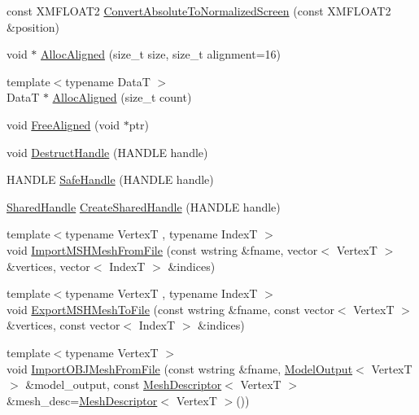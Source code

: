 \begin{DoxyCompactItemize}
\item 
const X\+M\+F\+L\+O\+A\+T2 \hyperlink{namespacemage_a9ef1aad29d7631ee2d88467faca6cc56}{Convert\+Absolute\+To\+Normalized\+Screen} (const X\+M\+F\+L\+O\+A\+T2 \&position)
\item 
void $\ast$ \hyperlink{namespacemage_a5bfc93e9988b3b967b2e0bbf9256eee2}{Alloc\+Aligned} (size\+\_\+t size, size\+\_\+t alignment=16)
\item 
{\footnotesize template$<$typename DataT $>$ }\\DataT $\ast$ \hyperlink{namespacemage_a8facb28d3867eefd618db6c859d349d5}{Alloc\+Aligned} (size\+\_\+t count)
\item 
void \hyperlink{namespacemage_a401c54df21447c491c527735647b5f80}{Free\+Aligned} (void $\ast$ptr)
\item 
void \hyperlink{namespacemage_a7bf12816896ea8d126d397f0c6d571b1}{Destruct\+Handle} (H\+A\+N\+D\+LE handle)
\item 
H\+A\+N\+D\+LE \hyperlink{namespacemage_a80f95ce7eb0d03d5576351663d626b4d}{Safe\+Handle} (H\+A\+N\+D\+LE handle)
\item 
\hyperlink{namespacemage_ab892828913d6129acf71e0cec60467e5}{Shared\+Handle} \hyperlink{namespacemage_a3119898d7caac71d8ee495c3ae3194b1}{Create\+Shared\+Handle} (H\+A\+N\+D\+LE handle)
\item 
{\footnotesize template$<$typename VertexT , typename IndexT $>$ }\\void \hyperlink{namespacemage_ad98d571312abaaa2b0b7dd13958f5100}{Import\+M\+S\+H\+Mesh\+From\+File} (const wstring \&fname, vector$<$ VertexT $>$ \&vertices, vector$<$ IndexT $>$ \&indices)
\item 
{\footnotesize template$<$typename VertexT , typename IndexT $>$ }\\void \hyperlink{namespacemage_a6558ce42c284f76e6bb08bc0f9cabfc3}{Export\+M\+S\+H\+Mesh\+To\+File} (const wstring \&fname, const vector$<$ VertexT $>$ \&vertices, const vector$<$ IndexT $>$ \&indices)
\item 
{\footnotesize template$<$typename VertexT $>$ }\\void \hyperlink{namespacemage_abeaf36b602f5ed971b1b505e42972e4f}{Import\+O\+B\+J\+Mesh\+From\+File} (const wstring \&fname, \hyperlink{structmage_1_1_model_output}{Model\+Output}$<$ VertexT $>$ \&model\+\_\+output, const \hyperlink{structmage_1_1_mesh_descriptor}{Mesh\+Descriptor}$<$ VertexT $>$ \&mesh\+\_\+desc=\hyperlink{structmage_1_1_mesh_descriptor}{Mesh\+Descriptor}$<$ VertexT $>$())
\item 

\end{DoxyCompactItemize}
